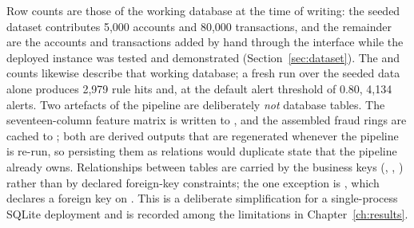 Row counts are those of the working database at the time of writing: the seeded dataset contributes 5,000 accounts and 80,000 transactions, and the remainder are the accounts and transactions added by hand through the interface while the deployed instance was tested and demonstrated (Section~\ref{sec:dataset}). The  and  counts likewise describe that working database; a fresh run over the seeded data alone produces 2,979 rule hits and, at the default alert threshold of 0.80, 4,134 alerts. Two artefacts of the pipeline are deliberately \textit{not} database tables. The seventeen-column feature matrix is written to , and the assembled fraud rings are cached to ; both are derived outputs that are regenerated whenever the pipeline is re-run, so persisting them as relations would duplicate state that the pipeline already owns. Relationships between tables are carried by the business keys (, , ) rather than by declared foreign-key constraints; the one exception is , which declares a foreign key on . This is a deliberate simplification for a single-process SQLite deployment and is recorded among the limitations in Chapter~\ref{ch:results}.

